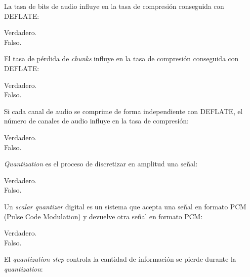\documentclass[legalpaper, 12pt, addpoints]{exam}
\begin{document}
\begin{questions}
\question La tasa de bits de audio influye en la tasa de compresión conseguida con DEFLATE:

\begin{oneparchoices}
  \choice Verdadero.\\
  \choice Falso.
\end{oneparchoices}
  
\vspace{0.10in}

\question El tasa de pérdida de \emph{chunks} influye en la tasa de compresión conseguida con DEFLATE:

\begin{oneparchoices}
  \choice Verdadero.\\
  \choice Falso.
\end{oneparchoices}
  
\vspace{0.10in}

\question Si cada canal de audio se comprime de forma
independiente con DEFLATE, el número de canales de audio influye en la tasa de compresión:

\begin{oneparchoices}
  \choice Verdadero.\\
  \choice Falso.
\end{oneparchoices}
  
\vspace{0.10in}

\question \emph{Quantization} es el proceso de discretizar en amplitud una señal:

\begin{oneparchoices}
  \choice Verdadero.\\
  \choice Falso.
\end{oneparchoices}
  
\vspace{0.10in}

\question Un \emph{scalar quantizer} digital es un sistema que acepta una señal
en formato PCM (Pulse Code Modulation) y devuelve otra señal en formato PCM:

\begin{oneparchoices}
  \choice Verdadero.\\
  \choice Falso.
\end{oneparchoices}
  
\vspace{0.10in}

\question El \emph{quantization step} controla la cantidad de información se pierde durante la \emph{quantization}:


\end{questions}
\end{document}
